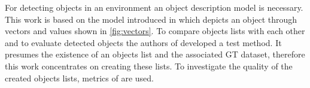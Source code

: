 
For detecting objects in an environment an object description model is necessary. This work is based on the model introduced in \cite{Aeberhard} which depicts an object through vectors and values shown in \cref{fig:vectors}.
To compare objects lists with each other and to evaluate detected objects the authors of \cite{Reway} developed a test method. It presumes the existence of an objects list and the associated GT dataset, therefore this work concentrates on creating these lists. To investigate the quality of the created objects lists, metrics of \cite{Reway} are used.
